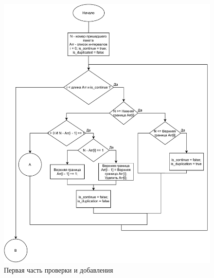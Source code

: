 \documentclass[14pt, a4paper]{extarticle}
\begin{document}
\begin{figure}[H]
	\centering
	\includegraphics[scale=0.9]{check1.pdf}
	\caption{Первая часть проверки и добавления}
	\label{check1}
\end{figure}
\end{document}
